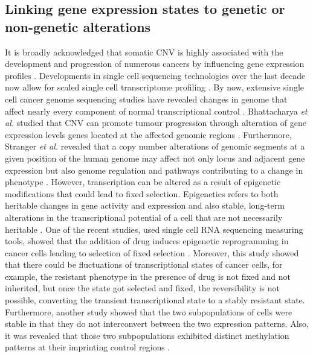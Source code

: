 \subsection{Linking gene expression states to genetic or non-genetic alterations}
It is broadly acknowledged that somatic CNV is highly associated with the development and progression of numerous cancers by influencing gene expression profiles \cite{yang2017prame, gut2018sox2}. 
Developments in single cell sequencing technologies over the last decade now allow for scaled single cell transcriptome profiling \cite{zahn2017scalable, zheng2017massively}.
By now, extensive single cell cancer genome sequencing studies have revealed changes in genome that affect nearly every component of normal transcriptional control \cite{garraway2013lessons}. 
Bhattacharya \textit{et al.} studied that CNV can promote tumour progression through alteration of gene expression levels genes located at the affected genomic regions \cite{bhattacharya2020transcriptional, henrichsen2009segmental, tang2013gene}. Furthermore, Stranger \textit{et al.} revealed that a copy number alterations of genomic segments at a given position of the human genome may affect not only locus and adjacent gene expression but also genome regulation and pathways contributing to a change in phenotype \cite{stranger2007relative}. However, transcription can be altered as a result of epigenetic modifications that could lead to fixed selection. Epigenetics refers to both heritable changes in gene activity and expression and also stable, long-term alterations in the transcriptional potential of a cell that are not necessarily heritable \cite {aristizabal2020biological, nih2019overview}.
One of the recent studies, used single cell RNA sequencing measuring tools, showed that the addition of drug induces epigenetic reprogramming in cancer cells leading to selection of fixed selection \cite{shaffer2017rare}. Moreover, this study showed that there could be fluctuations of transcriptional states of cancer cells, for example, the resistant phenotype in the presence of drug is not fixed and not inherited, but once the state got selected and fixed, the reversibility is not possible, converting the transient transcriptional state to a stably resistant state. Furthermore, another study showed that the two subpopulations of cells were stable in that they do not interconvert between the two expression patterns. Also, it was revealed that those two subpopulations exhibited distinct methylation patterns at their imprinting control regions \cite{ginart2016visualizing}.


